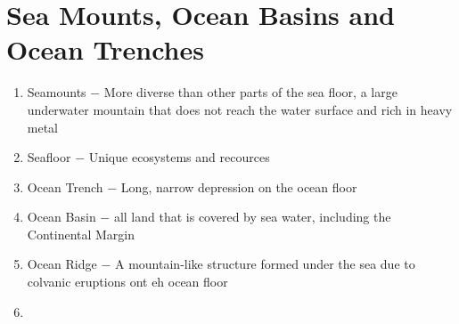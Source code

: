 \documentclass{report}
\begin{document}
\section{Sea Mounts, Ocean Basins and Ocean Trenches}
\begin{enumerate}
    \item Seamounts $-$ More diverse than other parts of the sea floor, a large underwater mountain that does not reach the water surface and rich in heavy metal 
    \item Seafloor $-$ Unique ecosystems and recources
    \item Ocean Trench $-$ Long, narrow depression on the ocean floor 
    \item Ocean Basin $-$ all land that is covered by sea water, including the Continental Margin
    \item Ocean Ridge $-$ A mountain-like structure formed under the sea due to colvanic eruptions ont eh ocean floor 
    \item 
\end{enumerate}
\end{document}
